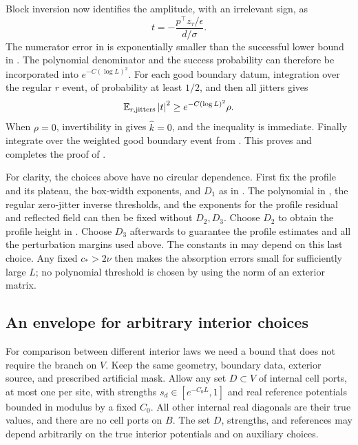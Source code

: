 Block inversion now identifies the amplitude, with an irrelevant sign,
as
\begin{equation}
 t=-\frac{p^\top z_\tau/\epsilon}{d/\sigma}.
 \label{trans:final-root-amplitude}
\end{equation}
The numerator error in  is exponentially
smaller than the successful lower bound in .
The polynomial denominator and the success probability can therefore
be incorporated into $e^{-C(\log L)^2}$. For each good boundary datum,
integration over the regular $r$ event, of probability at least $1/2$,
and then all jitters gives
\[
 \mathbb E_{r,\rm jitters}\left\lvert t\right\rvert^2
 \ge e^{-C(\log L)^2}\rho.
\]
When $\rho=0$, invertibility in  gives
$\widehat k=0$, and the inequality is immediate. Finally integrate
over the weighted good boundary event from .
This proves  and completes the proof of
.

For clarity, the choices above have no circular dependence. First fix
the profile and its plateau, the box-width exponents, and $D_1$ as
in . The polynomial in , the
regular zero-jitter inverse thresholds, and the exponents for the
profile residual and reflected field can then be fixed without
$D_2,D_3$. Choose $D_2$ to obtain the profile height in
. Choose $D_3$ afterwards to guarantee
the profile estimates and all the perturbation margins used above.
The constants in  may depend on this
last choice. Any fixed $c_*>2\nu$ then makes the absorption errors
small for sufficiently large $L$; no polynomial threshold is chosen
by using the norm of an exterior matrix.

\subsection{An envelope for arbitrary interior choices}

For comparison between different interior laws we need a bound that
does not require the branch on $V$. Keep the same geometry, boundary
data, exterior source, and prescribed artificial mask. Allow any set
$D\subset V$ of internal cell ports, at most one per site, with
strengths $s_d\in[e^{-C_0L},1]$ and real reference potentials bounded
in modulus by a fixed $C_0$. All other internal real diagonals are
their true values, and there are no cell ports on $B$. The set $D$,
strengths, and references may depend arbitrarily on the true
interior potentials and on auxiliary choices.

